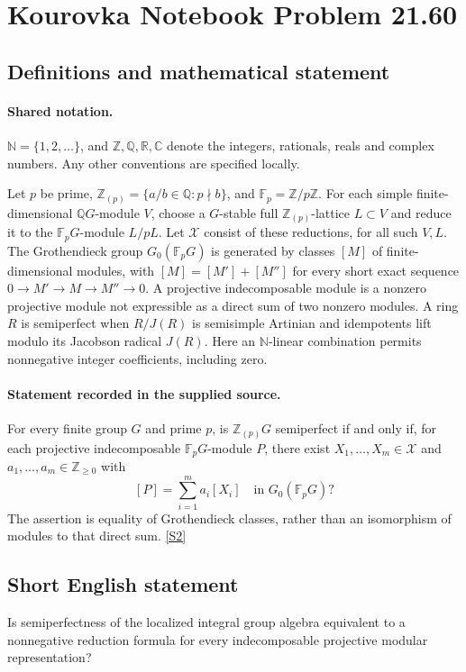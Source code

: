 \documentclass[11pt]{article}
\newcommand{\sref}[2]{\hyperlink{source:#1:#2}{[S#2]}}
\begin{document}
\section{Kourovka Notebook Problem 21.60}\label{statement}

\subsection{Definitions and mathematical statement}

\paragraph{Shared notation.}$\mathbb N=\{1,2,\ldots\}$, and $\mathbb Z,\mathbb Q,\mathbb R,\mathbb C$ denote the integers, rationals, reals and complex numbers. Any other conventions are specified locally.


Let $p$ be prime, $\mathbb Z_{(p)}=\{a/b\in\mathbb Q:p\nmid b\}$, and $\mathbb F_p=\mathbb Z/p\mathbb Z$. For each simple finite-dimensional $\mathbb QG$-module $V$, choose a $G$-stable full $\mathbb Z_{(p)}$-lattice $L\subset V$ and reduce it to the $\mathbb F_pG$-module $L/pL$. Let $\mathcal X$ consist of these reductions, for all such $V,L$. The Grothendieck group $G_0(\mathbb F_pG)$ is generated by classes $[M]$ of finite-dimensional modules, with $[M]=[M']+[M'']$ for every short exact sequence $0\to M'\to M\to M''\to0$. A projective indecomposable module is a nonzero projective module not expressible as a direct sum of two nonzero modules. A ring $R$ is semiperfect when $R/J(R)$ is semisimple Artinian and idempotents lift modulo its Jacobson radical $J(R)$. Here an $\mathbb N$-linear combination permits nonnegative integer coefficients, including zero.
\paragraph{Statement recorded in the supplied source.}
For every finite group $G$ and prime $p$, is $\mathbb Z_{(p)}G$ semiperfect if and only if, for each projective indecomposable $\mathbb F_pG$-module $P$, there exist $X_1,\ldots,X_m\in\mathcal X$ and $a_1,\ldots,a_m\in\mathbb Z_{\geq0}$ with
\[
 [P]=\sum_{i=1}^{m}a_i[X_i]\quad\text{in }G_0(\mathbb F_pG)?
\]
The assertion is equality of Grothendieck classes, rather than an isomorphism of modules to that direct sum. \sref{statement}{2}
\subsection{Short English statement}
Is semiperfectness of the localized integral group algebra equivalent to a nonnegative reduction formula for every indecomposable projective modular representation?
\end{document}
